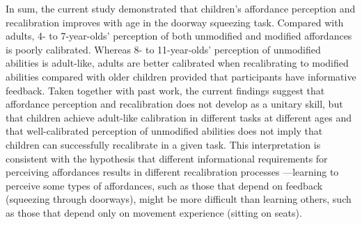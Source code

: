 \documentclass[a4paper,man,natbib,floatsintext,noextraspace]{apa6}
\begin{document}
In sum, the current study demonstrated that children's affordance perception and recalibration improves with age in the doorway squeezing task. Compared with adults, 4- to 7-year-olds' perception of both unmodified and modified affordances is poorly calibrated. Whereas 8- to 11-year-olds' perception of unmodified abilities is adult-like, adults are better calibrated when recalibrating to modified abilities compared with older children provided that participants have informative feedback. Taken together with past work,  \citep{ChenRecal,ChildReaching,KlevbergAnderson,Plumert95} the current findings suggest that affordance perception and recalibration does not develop as a unitary skill, but that children achieve adult-like calibration in different tasks at different ages and that well-calibrated perception of unmodified abilities does not imply that children can successfully recalibrate in a given task. This interpretation is consistent with the hypothesis that different informational requirements for perceiving affordances results in different recalibration processes \citep{Recal,DoorwayLearning}---learning to perceive some types of affordances, such as those that depend on feedback (squeezing through doorways), might be more difficult than learning others, such as those that depend only on movement experience (sitting on seats). 


\end{document}

